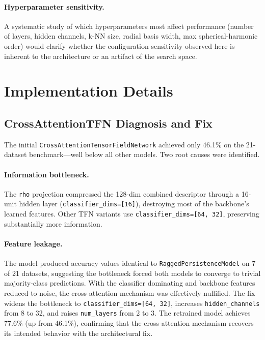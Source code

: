\documentclass[a4paper,11pt]{article}
\begin{document}
\paragraph{Hyperparameter sensitivity.}
A systematic study of which hyperparameters most affect performance (number of layers, hidden channels, k-NN size, radial basis width, max spherical-harmonic order) would clarify whether the configuration sensitivity observed here is inherent to the architecture or an artifact of the search space.

\newpage
\appendix

\section{Implementation Details} \label{app:debugging}

\subsection{CrossAttentionTFN Diagnosis and Fix}

The initial \texttt{CrossAttentionTensorFieldNetwork} achieved only 46.1\% on the 21-dataset benchmark---well below all other models.
Two root causes were identified.

\paragraph{Information bottleneck.}
The \texttt{rho} projection compressed the 128-dim combined descriptor through a 16-unit hidden layer (\texttt{classifier\_dims=[16]}), destroying most of the backbone's learned features.
Other TFN variants use \texttt{classifier\_dims=[64, 32]}, preserving substantially more information.
\paragraph{Feature leakage.}
The model produced accuracy values identical to \texttt{RaggedPersistenceModel} on 7 of 21 datasets, suggesting the bottleneck forced both models to converge to trivial majority-class predictions.
With the classifier dominating and backbone features reduced to noise, the cross-attention mechanism was effectively nullified.
The fix widens the bottleneck to \texttt{classifier\_dims=[64, 32]}, increases \texttt{hidden\_channels} from 8 to 32, and raises \texttt{num\_layers} from 2 to 3.
The retrained model achieves 77.6\% (up from 46.1\%), confirming that the cross-attention mechanism recovers its intended behavior with the architectural fix.
\end{document}
